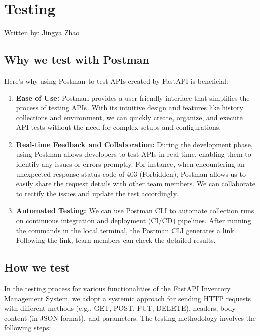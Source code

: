 \section{Testing}
{\tiny Written by: Jingya Zhao}\\

\subsection{Why we test with Postman}

Here’s why using Postman to test APIs created by FastAPI is beneficial:

\begin{enumerate}
    \item \textbf{Ease of Use:} Postman provides a user-friendly interface that simplifies the process of testing APIs. With its intuitive design and features like history collections and environment, we can quickly create, organize, and execute API tests without the need for complex setups and configurations.

    \item \textbf{Real-time Feedback and Collaboration:} During the development phase, using Postman allows developers to test APIs in real-time, enabling them to identify any issues or errors promptly. For instance, when encountering an unexpected response status code of 403 (Forbidden), Postman allows us to easily share the request details with other team members. We can collaborate to rectify the issues and update the test accordingly.

    \item \textbf{Automated Testing:} We can use Postman CLI to automate collection runs on continuous integration and deployment (CI/CD) pipelines. After running the commands in the local terminal, the Postman CLI generates a link. Following the link, team members can check the detailed results.
\end{enumerate}

\subsection{How we test}

In the testing process for various functionalities of the FastAPI Inventory Management System, we adopt a systemic approach for sending HTTP requests with different methods (e.g., GET, POST, PUT, DELETE), headers, body content (in JSON format), and parameters. The testing methodology involves the following steps:

